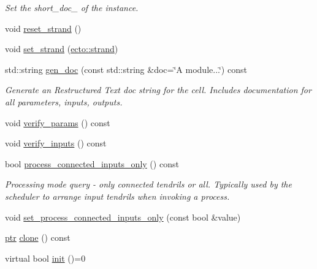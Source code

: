 \begin{DoxyCompactItemize}
\begin{DoxyCompactList}\small\item\em Set the short\-\_\-doc\-\_\- of the instance. \end{DoxyCompactList}\item 
void \hyperlink{structecto_1_1cell_af32a9e2113b7afcb5b225bdc3c234e8c}{reset\-\_\-strand} ()
\item 
void \hyperlink{structecto_1_1cell_ae0009fc4a4d12d400126f455396f5c9f}{set\-\_\-strand} (\hyperlink{structecto_1_1strand}{ecto\-::strand})
\item 
std\-::string \hyperlink{structecto_1_1cell_a486454d7466c5f0373ecb42dd4e97b2f}{gen\-\_\-doc} (const std\-::string \&doc=\char`\"{}A module...\char`\"{}) const 
\begin{DoxyCompactList}\small\item\em Generate an Restructured Text doc string for the cell. Includes documentation for all parameters, inputs, outputs. \end{DoxyCompactList}\item 
void \hyperlink{structecto_1_1cell_aa03c0f569bb4b14e81f4d2a8747273e5}{verify\-\_\-params} () const 
\item 
void \hyperlink{structecto_1_1cell_aed712e80344ce04dbb9105bb6a1aa53a}{verify\-\_\-inputs} () const 
\item 
bool \hyperlink{structecto_1_1cell_ab1dfafd237e0adf273af65d549e7516e}{process\-\_\-connected\-\_\-inputs\-\_\-only} () const 
\begin{DoxyCompactList}\small\item\em Processing mode query -\/ only connected tendrils or all. Typically used by the scheduler to arrange input tendrils when invoking a process. \end{DoxyCompactList}\item 
void \hyperlink{structecto_1_1cell_a4c42ef400acac92d825e7dc25ff53bdc}{set\-\_\-process\-\_\-connected\-\_\-inputs\-\_\-only} (const bool \&value)
\item 
\hyperlink{structecto_1_1cell_af2cab9d2bc012088c4f58c40da57a862}{ptr} \hyperlink{structecto_1_1cell_a213dabd285300f5d4c7e0f5fd6142e81}{clone} () const 
\item 
virtual bool \hyperlink{structecto_1_1cell_ab9a6c3fd8f76289f338a9e05368b1aff}{init} ()=0
\end{DoxyCompactItemize}
